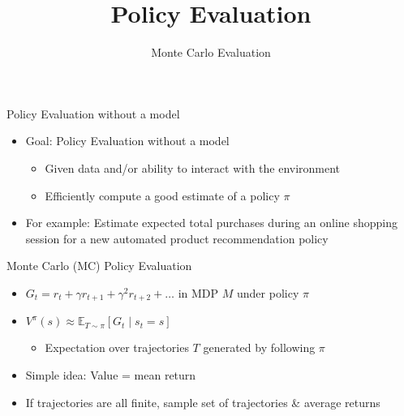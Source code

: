 \documentclass[aspectratio=169]{../latex_main/tntbeamer}  %
\title[Reinforcement Learning: Policy Evaluation]{Policy Evaluation}
\subtitle{Monte Carlo Evaluation}
\begin{document}
	
	\maketitle

\begin{frame}[c]{Policy Evaluation without a model}

\begin{itemize}
	\item Goal: Policy Evaluation without a model
	\begin{itemize}
		\item  	Given data and/or ability to interact with the environment
		\item Efficiently compute a good estimate of a policy $\pi$
	\end{itemize}
	\smallskip
	\item For example: Estimate expected total purchases during an online shopping
	session for a new automated product recommendation policy
\end{itemize}



\end{frame}
\begin{frame}[c]{Monte Carlo (MC) Policy Evaluation}

\begin{itemize}
	\item $G_t = r_t + \gamma r_{t+1} + \gamma^2 r_{t+2} + \ldots$ in MDP $M$ under policy $\pi$
	\smallskip
	\item $V^\pi(s) \approx \mathbb{E}_{T \sim \pi} [G_t \mid s_t = s]$
	\begin{itemize}
		\item Expectation over trajectories $T$ generated by following $\pi$
	\end{itemize}
 	\smallskip
	\item Simple idea: Value = mean return
	\item If trajectories are all finite, sample set of trajectories \& average returns
\end{itemize}

\end{frame}
\end{document}

